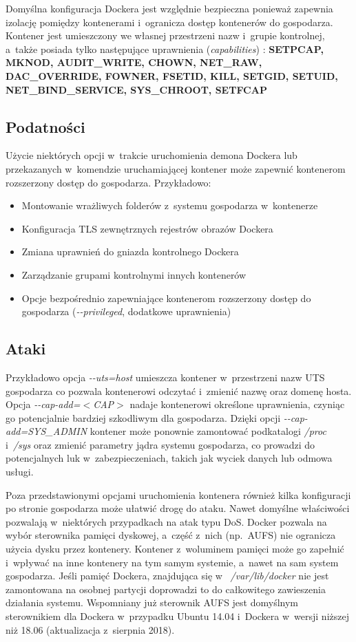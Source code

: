 Domyślna konfiguracja Dockera jest względnie bezpieczna ponieważ zapewnia izolację pomiędzy kontenerami i~ogranicza dostęp kontenerów do gospodarza. Kontener jest umieszczony we własnej przestrzeni nazw i~grupie kontrolnej, a~także posiada tylko następujące uprawnienia (\textit{capabilities}) \cite{DockerRunReference}: \textbf{SETPCAP, MKNOD, AUDIT\_WRITE, CHOWN, NET\_RAW, DAC\_OVERRIDE, FOWNER, FSETID, KILL, SETGID, SETUID, NET\_BIND\_SERVICE, SYS\_CHROOT, SETFCAP}

\subsection{Podatności}

Użycie niektórych opcji w~trakcie uruchomienia demona Dockera lub przekazanych w~komendzie uruchamiającej kontener może zapewnić kontenerom rozszerzony dostęp do gospodarza. Przykładowo:

\begin{itemize}
    \item Montowanie wrażliwych folderów z~systemu gospodarza w~kontenerze
    \item Konfiguracja TLS zewnętrznych rejestrów obrazów Dockera
    \item Zmiana uprawnień do gniazda kontrolnego Dockera
    \item Zarządzanie grupami kontrolnymi innych kontenerów
    \item Opcje bezpośrednio zapewniające kontenerom rozszerzony dostęp do gospodarza (\textit{-{}-privileged}, dodatkowe uprawnienia)
\end{itemize}

\subsection{Ataki}

Przykładowo opcja \textit{-{}-uts=host} umieszcza kontener w~przestrzeni nazw UTS gospodarza co pozwala kontenerowi odczytać i~zmienić nazwę oraz domenę hosta. Opcja \textit{-{}-cap-add=$<$CAP$>$} nadaje kontenerowi określone uprawnienia, czyniąc go potencjalnie bardziej szkodliwym dla gospodarza. Dzięki opcji \textit{-{}-cap-add=SYS_ADMIN} kontener może ponownie zamontować podkatalogi \textit{/proc} i~\textit{/sys} oraz zmienić parametry jądra systemu gospodarza, co prowadzi do potencjalnych luk w~zabezpieczeniach, takich jak wyciek danych lub odmowa usługi.

Poza przedstawionymi opcjami uruchomienia kontenera również kilka konfiguracji po stronie gospodarza może ułatwić drogę do ataku. Nawet domyślne właściwości pozwalają w~niektórych przypadkach na atak typu DoS. Docker pozwala na wybór sterownika pamięci dyskowej, a~część z~nich (np.~AUFS) nie ogranicza użycia dysku przez kontenery. Kontener z~woluminem pamięci może go zapełnić i~wpływać na inne kontenery na tym samym systemie, a~nawet na sam system gospodarza. Jeśli pamięć Dockera, znajdująca się w~ \textit{/var/lib/docker} nie jest zamontowana na osobnej partycji doprowadzi to do całkowitego zawieszenia działania systemu. Wspomniany już sterownik AUFS jest domyślnym sterownikiem dla Dockera w~przypadku Ubuntu 14.04 i~Dockera w~wersji niższej niż 18.06 (aktualizacja z~sierpnia 2018).

